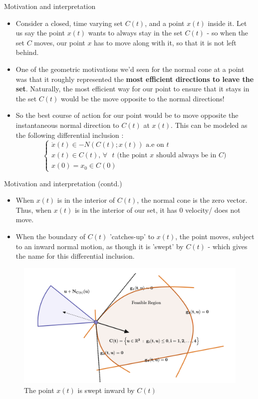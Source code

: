 \documentclass[8pt,aspectratio=169]{beamer}
\begin{document}
\begin{frame}{Motivation and interpretation}
    \begin{itemize}
        \item Consider a closed, time varying set $C(t)$, and a point $x(t)$ inside it. Let us say the point $x(t)$ wants to always stay in the set $C(t)$ - so when the set $C$ moves, our point $x$ has to move along with it, so that it is not left behind.
        \item One of the geometric motivations we'd seen for the normal cone at a point was that it roughly represented the \textbf{most efficient directions to leave the set}. Naturally, the most efficient way for our point to ensure that it stays in the set $C(t)$ would be the move opposite to the normal directions!
        \item So the best course of action for our point would be to move opposite the instantaneous normal direction to $C(t)$ at $x(t)$. This can be modeled as the following differential inclusion : 
            \begin{equation}\label{swp}
                \begin{cases}
                    \dot{x}(t) \in -N(C(t); x(t)) \text{ a.e on } t\\
                    x(t) \in C(t) \text{, } \forall \text{ } t \text{ (the point $x$ should always be in $C$)}\\
                    x(0) = x_0 \in C(0)
                \end{cases}
            \end{equation}
    \end{itemize}    
\end{frame}

\begin{frame}{Motivation and interpretation (contd.)}
    \begin{itemize}
        \item When $x(t)$ is in the interior of $C(t)$, the normal cone is the zero vector. Thus, when $x(t)$ is in the interior of our set, it has 0 velocity/ does not move.
        \item When the boundary of $C(t)$ 'catches-up' to $x(t)$, the point moves, subject to an inward normal motion, as though it is 'swept' by $C(t)$ - which gives the name for this differential inclusion.
    \end{itemize}

    \begin{figure}[h]
        \centering
        \includegraphics[width=0.5\linewidth]{swept_by_set.png}
        \caption{The point $x(t)$ is swept inward by $C(t)$}
        \label{fig:enter-label}
    \end{figure}    
\end{frame}
\end{document}
